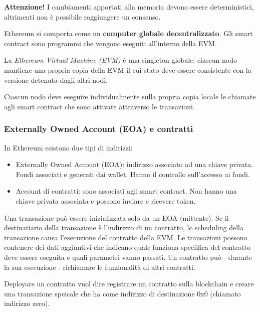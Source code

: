 \documentclass[a4paper]{article}
\begin{document}
\vspace{1em}
\noindent
\textbf{Attenzione!} I cambiamenti apportati alla memoria devono essere deterministici, altrimenti non è possibile raggiungere un consenso.

\vspace{1em}
\noindent
Ethereum si comporta come un \textbf{computer globale decentralizzato}. Gli smart contract sono programmi che vengono eseguiti all'interno della EVM.

\begin{definition}
    La \textit{Ethereum Virtual Machine (EVM)} è una singleton globale: ciascun nodo mantiene una propria copia della EVM il cui stato deve essere consistente con la versione detenuta dagli altri nodi.
\end{definition}
\noindent
Ciascun nodo deve eseguire individualmente sulla propria copia locale le chiamate agli smart contract che sono attivate attraverso le transazioni.

\subsubsection{Externally Owned Account (EOA) e contratti}

In Ethereum esistono due tipi di indirizzi:
\begin{itemize}
    \item Externally Owned Account (EOA): indirizzo associato ad una chiave privata. Fondi associati e generati dai wallet. Hanno il controllo sull'accesso ai fondi.
    \item Account di contratti: sono associati agli smart contract. Non hanno una chiave privata associata e possono inviare e ricevere token.
\end{itemize}
\noindent
Una transazione può essere inizializzata solo da un EOA (mittente). Se il destinatiario della transazione è l'indirizzo di un contratto, lo scheduling
della transazione causa l'esecuzione del contratto della EVM.
Le transazioni possono contenere dei dati aggiuntivi che indicano quale funziona speciifica del contratto deve essere eseguita e quali parametri vanno passati.
Un contratto può - durante la sua esecuzione - richiamare le funzionalità di altri contratti.

\begin{definition}
    Deployare un contratto vuol dire registrare un contratto sulla blockchain e creare una transazione speicale che ha come indirizzo di destinazione 0x0 (chiamato indirizzo zero).
\end{definition}
\end{document}
